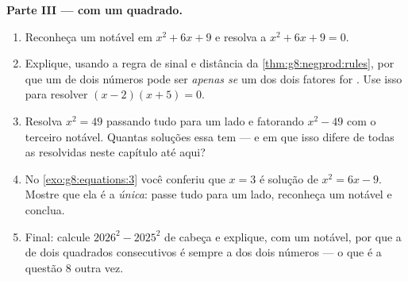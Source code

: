\begin{problem}[{Problema de fim de semana --- $(a+b)^2$, $(a-b)^2$,
$(a+b)(a-b)$, e a soma $1 + 3 + 5 + \dots + (2n-1) = n^2$}]
\medskip
\noindent\textbf{Parte III ---  com um quadrado.}
\begin{enumerate}[resume]
  \item Reconheça um  notável em $x^2 + 6x + 9$ e resolva a
         $x^2 + 6x + 9 = 0$.
  \item Explique, usando a regra de sinal e distância da
        \cref{thm:g8:negprod:rules}, por que um  de dois números
        pode ser  \emph{apenas se} um dos dois fatores for .
        Use isso para resolver $(x - 2)(x + 5) = 0$.
  \item Resolva $x^2 = 49$ passando tudo para um lado e fatorando
        $x^2 - 49$ com o terceiro  notável. Quantas soluções
        essa  tem --- e em que isso difere de todas as 
        resolvidas neste capítulo até aqui?
  \item No \cref{exo:g8:equations:3} você conferiu que $x = 3$ é
        solução de $x^2 = 6x - 9$. Mostre que ela é a \emph{única}:
        passe tudo para um lado, reconheça um  notável e
        conclua.
  \item Final: calcule $2026^2 - 2025^2$ de cabeça e explique, com um
         notável, por que a  de dois quadrados
        consecutivos é sempre a  dos dois números --- o que é a
        questão 8 outra vez.
\end{enumerate}
\end{problem}
